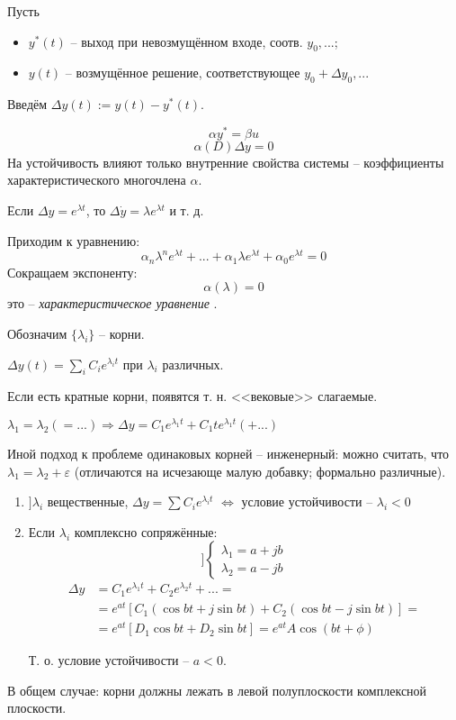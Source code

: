 \documentclass[main.tex]{subfiles}
\begin{document}
Пусть
\begin{itemize}[noitemsep]
    \item $y^*(t)$ -- выход при невозмущённом входе, соотв. $y_0, ...$;
    \item $y(t) $ -- возмущённое решение, соответствующее $y_0 + \Delta y_0, ...$
\end{itemize}

Введём $ \Delta y(t) := y(t) - y^*(t) $.

\[ \alpha y^* = \beta u \]
\[ \boxed{ \alpha(D) \Delta y = 0 } \]
На устойчивость влияют только внутренние свойства системы -- коэффициенты характеристического многочлена $ \alpha $.

Если $ \Delta y = e^{\lambda t} $, то $ \Delta \dot y = \lambda e^{\lambda t} $ и т. д.

Приходим к уравнению:
\[ \alpha_n \lambda^{n} e^{\lambda t} + ... + \alpha_1 \lambda e^{\lambda t} + \alpha_0 e^{\lambda t} = 0 \]
Сокращаем экспоненту:
\[ \boxed{ \alpha(\lambda) = 0 } \]
это -- \emph{ характеристическое уравнение }.

Обозначим $ \{  \lambda_i \} $ -- корни.

$ \Delta y(t) = \sum_i C_i e^{\lambda_i t} $ при $ \lambda_i $ различных.

Если есть кратные корни, появятся т. н. <<вековые>> слагаемые.

$\lambda_1 = \lambda_2 (= ...) \Rightarrow \Delta y = C_1 e^{\lambda_1 t} + C_1 t e^{\lambda_1 t} (+ ...) $

Иной подход к проблеме одинаковых корней -- инженерный: можно считать, что $ \lambda_1 = \lambda_2 + \varepsilon $ (отличаются на исчезающе малую добавку; формально различные).

\begin{enumerate}[noitemsep]
    \item $ ] \lambda_i $ вещественные, $ \Delta y = \sum C_i e^{\lambda_i t} $ $ \Leftrightarrow $ условие устойчивости -- $ \boxed{ \lambda_i < 0 } $
    \item Если $ \lambda_i $ комплексно сопряжённые:
    \[ ] \begin{cases}
        \lambda_1 = a + jb \\
        \lambda_2 = a - jb
    \end{cases} \]
    \begin{align*}
        \Delta y & = C_1 e^{\lambda_1 t} + C_2 e^{\lambda_2 t} + ... = \\
        & = e^{at} \left[ C_1 (\cos bt + j \sin bt) + C_2 (\cos bt - j \sin bt) \right] = \\
        & = e^{at}[D_1 \cos bt + D_2 \sin bt] = \boxed{ e^{at} A \cos(bt + \phi) }
    \end{align*}

    Т. о. условие устойчивости -- $ a < 0 $.
\end{enumerate}

В общем случае: корни должны лежать в левой полуплоскости комплексной плоскости.
\end{document}
